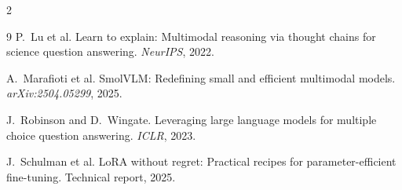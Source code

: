 \documentclass[11pt,a4paper]{article}
\begin{document}
\begin{multicols}{2}
\begin{thebibliography}{9}
P.~Lu et al.
Learn to explain: Multimodal reasoning via thought chains for science question answering.
\emph{NeurIPS}, 2022.

A.~Marafioti et al.
SmolVLM: Redefining small and efficient multimodal models.
\emph{arXiv:2504.05299}, 2025.

J.~Robinson and D.~Wingate.
Leveraging large language models for multiple choice question answering.
\emph{ICLR}, 2023.

J.~Schulman et al.
LoRA without regret: Practical recipes for parameter-efficient fine-tuning.
Technical report, 2025.

\end{thebibliography}

\end{multicols}
\end{document}

